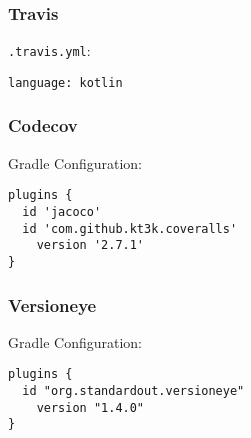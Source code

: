




\begin{frame}[fragile] \frametitle{Travis} 
\pause
\texttt{.travis.yml}:

\begin{lstlisting}
language: kotlin
\end{lstlisting}
\end{frame}


\begin{frame}[fragile] \frametitle{Codecov} 
\pause
Gradle Configuration:

\begin{lstlisting}
plugins {
  id 'jacoco'
  id 'com.github.kt3k.coveralls'
    version '2.7.1'
}
\end{lstlisting}
\end{frame}



\begin{frame}[fragile] \frametitle{Versioneye} 
\pause
Gradle Configuration:

\begin{lstlisting}
plugins {
  id "org.standardout.versioneye"
    version "1.4.0"
}
\end{lstlisting}
\end{frame}


